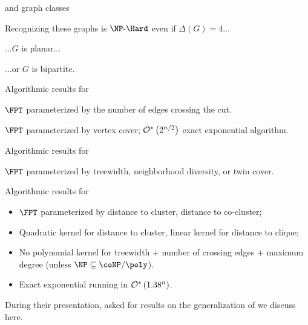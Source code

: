 \begin{frame}{ and graph classes}
    \pause
    \begin{block}{}
        Recognizing these graphs is $\NPH$ even if $\Delta(G) = 4$...
    \end{block}
    \pause
    \begin{block}{}
        ...$G$ is planar...
    \end{block}
    \pause
    \begin{block}{}
        ...or $G$ is bipartite.
    \end{block}
\end{frame}

\begin{frame}{Algorithmic results for }
    \begin{block}{}
        $\FPT$ parameterized by the number of edges crossing the cut.
    \end{block}
    \pause
    \begin{block}{}
        $\FPT$ parameterized by vertex cover; $\mathcal{O}^*\left(2^{n/2}\right)$ exact exponential algorithm.
    \end{block}
\end{frame}

\begin{frame}{Algorithmic results for }
    \begin{block}{}
        $\FPT$ parameterized by treewidth, neighborhood diversity, or twin cover.
    \end{block}
\end{frame}


\begin{frame}{Algorithmic results for }
    \begin{block}{}
        \begin{itemize}
            \item $\FPT$ parameterized by distance to cluster, distance to co-cluster;
            \item Quadratic kernel for distance to cluster, linear kernel for distance to clique;
            \item No polynomial kernel for treewidth $+$ number of crossing edges $+$ maximum degree (unless $\NP \subseteq \coNP/\poly$).
            \item Exact exponential running in $\mathcal{O}^*\left(1.38^n\right)$.
        \end{itemize}
    \end{block}
    \pause
    \begin{block}{}
        During their presentation, asked for results on the generalization of  we discuss here.
    \end{block}
\end{frame}


